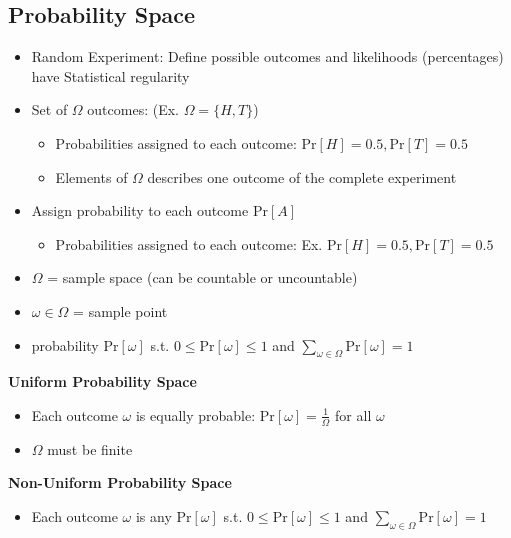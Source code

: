 \documentclass{article}\usepackage{amsmath,amssymb,amsthm,tikz,tkz-graph,color,chngpage,soul,hyperref,csquotes,graphicx,floatrow, listings}\newcommand*{\QEDB}{\hfill\ensuremath{\square}}\newtheorem*{prop}{Proposition}\renewcommand{\theenumi}{\alph{enumi}}\usepackage[shortlabels]{enumitem}\usepackage[nobreak=true]{mdframed}\usetikzlibrary{matrix,calc}\MakeOuterQuote{"}\usepackage[margin=0.75in]{geometry} \newtheorem{theorem}{Theorem}\newcommand{\Z}{\mathbb Z}\newcommand{\R}{\mathbb R}\newcommand{\Q}{\mathbb Q}\newcommand{\N}{\mathbb N}\newcommand{\x}[1]{\textrm{#1}}
\begin{document}
\subsection*{Probability Space}
\begin{itemize}
    \item Random Experiment: Define possible outcomes and likelihoods (percentages) have Statistical regularity
    \item Set of $\Omega$ outcomes: (Ex. $\Omega=\{H,T\}$)
    \begin{itemize}
        \item Probabilities assigned to each outcome: $\x{Pr}[H]=0.5, \x{Pr}[T]=0.5$
        \item Elements of $\Omega$ describes one outcome of the complete experiment
    \end{itemize}
    \item Assign probability to each outcome $\x{Pr}[A]$
    \begin{itemize}
        \item Probabilities assigned to each outcome: Ex. $\x{Pr}[H]=0.5, \x{Pr}[T]=0.5$
    \end{itemize}
\end{itemize}
\begin{mdframed}
\begin{itemize}
    \item $\Omega$ = sample space (can be countable or uncountable)
    \item $\omega \in \Omega$ = sample point
    \item probability $\x{Pr}[\omega]$ s.t. $0 \le \x{Pr}[\omega] \le 1$ and $\sum\limits_{\omega \in \Omega}\x{Pr}[\omega] = 1$
\end{itemize}
\end{mdframed}
\textbf{Uniform Probability Space}
\begin{itemize}
    \item Each outcome $\omega$ is equally probable: $\x{Pr}[\omega]=\frac{1}{\Omega}$ for all $\omega$
    \item $\Omega$ must be finite
\end{itemize}
\textbf{Non-Uniform Probability Space}
\begin{itemize}
    \item Each outcome $\omega$ is any $\x{Pr}[\omega]$ s.t. $0 \le \x{Pr}[\omega] \le 1$ and $\sum\limits_{\omega \in \Omega}\x{Pr}[\omega] = 1$
\end{itemize}
\end{document}
